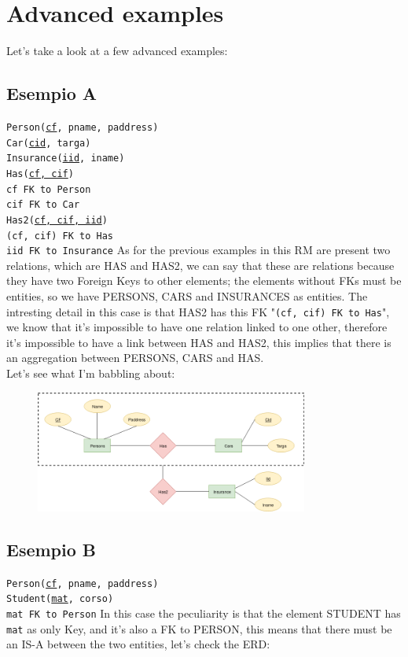 \documentclass[class=book, crop=false, oneside]{standalone}
\newcommand\tab[1][1cm]{\hspace*{#1}}
\begin{document}
\section{Advanced examples}
Let's take a look at a few advanced examples:
\subsection*{Esempio A}
\texttt{Person(\underline{cf}, pname, paddress)}\\
\texttt{Car(\underline{cid}, targa)}\\
\texttt{Insurance(\underline{iid}, iname)}\\
\texttt{Has(\underline{cf, cif})}\\
\tab[.4cm] \texttt{cf FK to Person}\\
\tab[.4cm] \texttt{cif FK to Car}\\
\texttt{Has2(\underline{cf, cif, iid})}\\
\tab[.4cm] \texttt{(cf, cif) FK to Has}\\
\tab[.4cm] \texttt{iid FK to Insurance}
\vskip 8pt
As for the previous examples in this RM are present two relations, which are HAS and HAS2, we can say that these are relations because they have two Foreign Keys to other elements; the elements without FKs must be entities, so we have PERSONS, CARS and INSURANCES as entities.
The intresting detail in this case is that HAS2 has this FK "\texttt{(cf, cif) FK to Has}", we know that it's impossible to have one relation linked to one other, therefore it's impossible to have a link between HAS and HAS2, this implies that there is an aggregation between PERSONS, CARS and HAS.\\
Let's see what I'm babbling about:
\begin{figure}[H]
	\includegraphics[width=0.8\textwidth,keepaspectratio]{diagram6_00.png}
	\caption{}
	\label{diagram6_00}
\end{figure}

\subsection*{Esempio B}
\texttt{Person(\underline{cf}, pname, paddress)}\\
\texttt{Student(\underline{mat}, corso)}\\
\tab[.4cm] \texttt{mat FK to Person}
\vskip 8pt
In this case the peculiarity is that the element STUDENT has \texttt{mat} as only Key, and it's also a FK to PERSON, this means that there must be an IS-A between the two entities, let's check the ERD:
\end{document}
